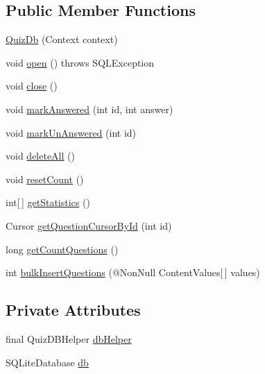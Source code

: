\subsection*{Public Member Functions}
\begin{DoxyCompactItemize}
\item 
\hyperlink{classorg_1_1buildmlearn_1_1toolkit_1_1quiztemplate_1_1data_1_1QuizDb_acdba8d7e662832d171ebdbe7b3380b4c}{Quiz\+Db} (Context context)
\item 
void \hyperlink{classorg_1_1buildmlearn_1_1toolkit_1_1quiztemplate_1_1data_1_1QuizDb_abbeed626bc5b552f8b954d6237a3f3b1}{open} ()  throws S\+Q\+L\+Exception 
\item 
void \hyperlink{classorg_1_1buildmlearn_1_1toolkit_1_1quiztemplate_1_1data_1_1QuizDb_a92a9fb76a38eb9d93962a06ccf754259}{close} ()
\item 
void \hyperlink{classorg_1_1buildmlearn_1_1toolkit_1_1quiztemplate_1_1data_1_1QuizDb_a886cc12d59eaf545f613113a0189ec25}{mark\+Answered} (int id, int answer)
\item 
void \hyperlink{classorg_1_1buildmlearn_1_1toolkit_1_1quiztemplate_1_1data_1_1QuizDb_a4010891a056a25437c671f4746bde454}{mark\+Un\+Answered} (int id)
\item 
void \hyperlink{classorg_1_1buildmlearn_1_1toolkit_1_1quiztemplate_1_1data_1_1QuizDb_add8fc835dc5da623099b3e23770dd2e4}{delete\+All} ()
\item 
void \hyperlink{classorg_1_1buildmlearn_1_1toolkit_1_1quiztemplate_1_1data_1_1QuizDb_ac7189bed768cf882069fd5b443ae28a7}{reset\+Count} ()
\item 
int\mbox{[}$\,$\mbox{]} \hyperlink{classorg_1_1buildmlearn_1_1toolkit_1_1quiztemplate_1_1data_1_1QuizDb_a052a88921f4aa69e7340742cbc69c288}{get\+Statistics} ()
\item 
Cursor \hyperlink{classorg_1_1buildmlearn_1_1toolkit_1_1quiztemplate_1_1data_1_1QuizDb_a5ca5b23055708af02c5a2d8e24d3a517}{get\+Question\+Cursor\+By\+Id} (int id)
\item 
long \hyperlink{classorg_1_1buildmlearn_1_1toolkit_1_1quiztemplate_1_1data_1_1QuizDb_ab1e36f88ab226535ce811465049c2a1c}{get\+Count\+Questions} ()
\item 
int \hyperlink{classorg_1_1buildmlearn_1_1toolkit_1_1quiztemplate_1_1data_1_1QuizDb_ab16060bc38aee8980bbbdc8ecf8626ab}{bulk\+Insert\+Questions} (@Non\+Null Content\+Values\mbox{[}$\,$\mbox{]} values)
\end{DoxyCompactItemize}
\subsection*{Private Attributes}
\begin{DoxyCompactItemize}
\item 
final Quiz\+D\+B\+Helper \hyperlink{classorg_1_1buildmlearn_1_1toolkit_1_1quiztemplate_1_1data_1_1QuizDb_a01f990a27fc631fd0f7f53640d8d84be}{db\+Helper}
\item 
S\+Q\+Lite\+Database \hyperlink{classorg_1_1buildmlearn_1_1toolkit_1_1quiztemplate_1_1data_1_1QuizDb_a279eb61d7a029a2081652a9fbd4dd104}{db}
\end{DoxyCompactItemize}
